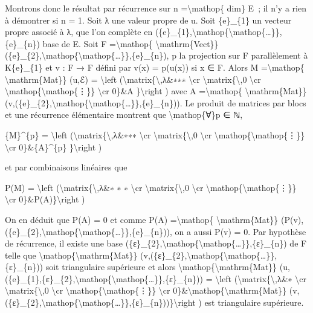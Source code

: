 \documentclass[]{article}
\begin{document}
Montrons donc le résultat par récurrence sur n =\textbackslash{}mathop\{
dim\} E~; il n'y a rien à démontrer si n = 1. Soit λ une valeur propre
de u. Soit \{e\}\_\{1\} un vecteur propre associé à λ, que l'on complète
en
(\{e\}\_\{1\},\textbackslash{}mathop\{\textbackslash{}mathop\{\ldots{}\}\},\{e\}\_\{n\})
base de E. Soit F =\textbackslash{}mathop\{
\textbackslash{}mathrm\{Vect\}\}(\{e\}\_\{2\},\textbackslash{}mathop\{\textbackslash{}mathop\{\ldots{}\}\},\{e\}\_\{n\}),
p la projection sur F parallèlement à K\{e\}\_\{1\} et v : F → F défini
par v(x) = p(u(x)) si x ∈ F. Alors M =\textbackslash{}mathop\{
\textbackslash{}mathrm\{Mat\}\} (u,ℰ) = \textbackslash{}left
(\textbackslash{}matrix\{\textbackslash{},λ\&∗∗∗ \textbackslash{}cr
\textbackslash{}matrix\{\textbackslash{},0 \textbackslash{}cr
\textbackslash{}mathop\{\textbackslash{}mathop\{⋮\}\} \textbackslash{}cr
0\}\&A \}\textbackslash{}right ) avec A =\textbackslash{}mathop\{
\textbackslash{}mathrm\{Mat\}\}
(v,(\{e\}\_\{2\},\textbackslash{}mathop\{\textbackslash{}mathop\{\ldots{}\}\},\{e\}\_\{n\})).
Le produit de matrices par blocs et une récurrence élémentaire montrent
que \textbackslash{}mathop\{∀\}p ∈ ℕ,

\{M\}\^{}\{p\} = \textbackslash{}left
(\textbackslash{}matrix\{\textbackslash{},λ\&∗∗∗ \textbackslash{}cr
\textbackslash{}matrix\{\textbackslash{},0 \textbackslash{}cr
\textbackslash{}mathop\{\textbackslash{}mathop\{⋮\}\} \textbackslash{}cr
0\}\&\{A\}\^{}\{p\} \}\textbackslash{}right )

et par combinaisons linéaires que

P(M) = \textbackslash{}left
(\textbackslash{}matrix\{\textbackslash{},λ\&∗ ∗ ∗ \textbackslash{}cr
\textbackslash{}matrix\{\textbackslash{},0 \textbackslash{}cr
\textbackslash{}mathop\{\textbackslash{}mathop\{⋮\}\} \textbackslash{}cr
0\}\&P(A)\}\textbackslash{}right )

On en déduit que P(A) = 0 et comme P(A) =\textbackslash{}mathop\{
\textbackslash{}mathrm\{Mat\}\}
(P(v),(\{e\}\_\{2\},\textbackslash{}mathop\{\textbackslash{}mathop\{\ldots{}\}\},\{e\}\_\{n\})),
on a aussi P(v) = 0. Par hypothèse de récurrence, il existe une base
(\{ε\}\_\{2\},\textbackslash{}mathop\{\textbackslash{}mathop\{\ldots{}\}\},\{ε\}\_\{n\})
de F telle que \textbackslash{}mathop\{\textbackslash{}mathrm\{Mat\}\}
(v,(\{ε\}\_\{2\},\textbackslash{}mathop\{\textbackslash{}mathop\{\ldots{}\}\},\{ε\}\_\{n\}))
soit triangulaire supérieure et alors
\textbackslash{}mathop\{\textbackslash{}mathrm\{Mat\}\}
(u,(\{e\}\_\{1\},\{ε\}\_\{2\},\textbackslash{}mathop\{\textbackslash{}mathop\{\ldots{}\}\},\{ε\}\_\{n\}))
= \textbackslash{}left (\textbackslash{}matrix\{\textbackslash{},λ\&∗
\textbackslash{}cr \textbackslash{}matrix\{\textbackslash{},0
\textbackslash{}cr \textbackslash{}mathop\{\textbackslash{}mathop\{⋮\}\}
\textbackslash{}cr
0\}\&\textbackslash{}mathop\{\textbackslash{}mathrm\{Mat\}\}
(v,(\{ε\}\_\{2\},\textbackslash{}mathop\{\textbackslash{}mathop\{\ldots{}\}\},\{ε\}\_\{n\}))\}\textbackslash{}right
) est triangulaire supérieure.
\end{document}
